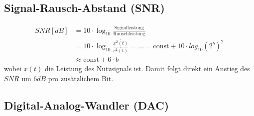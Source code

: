 		\subsection{Signal-Rausch-Abstand (SNR)}
		\begin{align}
			SNR[dB] &= 10 \cdot \log_{10} \frac{\text{Signalleistung}}{\text{Rauschleistung}} \nonumber\\
				&= 10 \cdot \log_{10} \frac{\overbar{x^2(t)}}{\overbar{e^2(t)}} = \dots = \text{const} + 10 \cdot log_{10}\left( 2^b \right)^2 \nonumber \\
				&\approx \text{const} + 6 \cdot b
		\end{align}
		wobei $x(t)$ die Leistung des Nutzsignals ist. Damit folgt direkt ein Anstieg des $SNR$ um $6dB$ pro zusätzlichem Bit.
		
		\subsection{Digital-Analog-Wandler (DAC)}